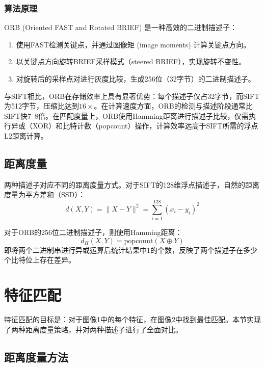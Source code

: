\documentclass[12pt]{article}
\begin{document}
\subsubsection{算法原理}

ORB (Oriented FAST and Rotated BRIEF) 是一种高效的二进制描述子：
\begin{enumerate}
    \item 使用FAST检测关键点，并通过图像矩 (image moments) 计算关键点方向。
    \item 以关键点方向旋转BRIEF采样模式（steered BRIEF），实现旋转不变性。
    \item 对旋转后的采样点对进行灰度比较，生成256位（32字节）的二进制描述子。
\end{enumerate}

与SIFT相比，ORB在存储效率上具有显著优势：每个描述子仅占32字节，而SIFT为512字节，压缩比达到$16\times$。在计算速度方面，ORB的检测与描述阶段通常比SIFT快7--8倍。在匹配度量上，ORB使用Hamming距离进行描述子比较，仅需执行异或（XOR）和比特计数（popcount）操作，计算效率远高于SIFT所需的浮点L2距离计算。

\subsection{距离度量}

两种描述子对应不同的距离度量方式。对于SIFT的128维浮点描述子，自然的距离度量为平方差和（SSD）：
\begin{equation}
d(X, Y) = \|X - Y\|^2 = \sum_{i=1}^{128}(x_i - y_i)^2
\end{equation}

对于ORB的256位二进制描述子，则使用Hamming距离：
\begin{equation}
d_H(X, Y) = \text{popcount}(X \oplus Y)
\end{equation}
即将两个二进制串进行异或运算后统计结果中1的个数，反映了两个描述子在多少个比特位上存在差异。

\section{特征匹配}

特征匹配的目标是：对于图像1中的每个特征，在图像2中找到最佳匹配。本节实现了两种距离度量策略，并对两种描述子进行了全面对比。

\subsection{距离度量方法}
\end{document}

